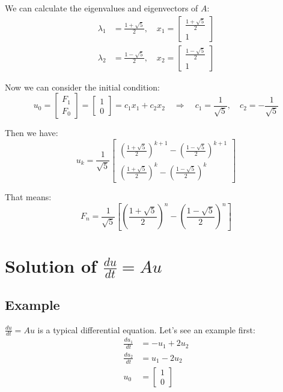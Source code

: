 \documentclass[10pt,a4paper,oneside,numbers=noenddot]{scrbook}
\theoremstyle{ctplain}
\theoremstyle{ctresult}
\begin{document}
We can calculate the eigenvalues and eigenvectors of $A$:
\begin{align*}
  \lambda_1 &= \frac{1 + \sqrt{5}}{2}, \quad
  x_1 = \begin{bmatrix}
    \frac{1 + \sqrt{5}}{2} \\
    1
  \end{bmatrix} \\
  \lambda_2 &= \frac{1 - \sqrt{5}}{2}, \quad
  x_2 = \begin{bmatrix}
    \frac{1 - \sqrt{5}}{2} \\
    1
  \end{bmatrix}
\end{align*}

Now we can consider the initial condition:
\[
  u_0 = \begin{bmatrix}
    F_1 \\
    F_0
  \end{bmatrix} =
  \begin{bmatrix}
    1 \\
    0
  \end{bmatrix} =
  c_1 x_1 + c_2 x_2
  \quad \Rightarrow \quad
  c_1 = \frac{1}{\sqrt{5}}, \quad c_2 = -\frac{1}{\sqrt{5}}
\]

Then we have:
\[
  u_k = \frac{1}{\sqrt{5}} \begin{bmatrix}
    \left(\frac{1 + \sqrt{5}}{2}\right)^{k+1} - \left(\frac{1 - \sqrt{5}}{2}\right)^{k+1} \\
    \left(\frac{1 + \sqrt{5}}{2}\right)^k - \left(\frac{1 - \sqrt{5}}{2}\right)^k
  \end{bmatrix}
\]

That means:
\[
  F_n = \frac{1}{\sqrt{5}} \left[
    \left(\frac{1 + \sqrt{5}}{2}\right)^n -
    \left(\frac{1 - \sqrt{5}}{2}\right)^n
  \right]
\]

\section{Solution of $\frac{du}{dt} = Au$}
\subsection{Example}

$\frac{du}{dt} = Au$ is a typical differential equation. Let's see an example first:
\begin{align*}
  \frac{du_1}{dt} &= -u_1 + 2u_2 \\
  \frac{du_2}{dt} &= u_1 - 2u_2 \\
  u_0 &= \begin{bmatrix} 1 \\ 0 \end{bmatrix}
\end{align*}
\end{document}
